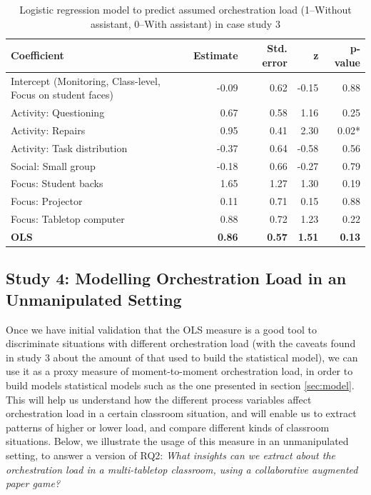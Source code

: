 \documentclass[10pt,journal,compsoc]{IEEEtran}
\begin{document}
\begin{table}[!t]
\caption{Logistic regression model to predict assumed orchestration load (1--Without assistant, 0--With assistant) in case study 3}
\label{tab:case3results}
\centering
\begin{tabular}{|p{2.8cm}||r|r|r|r|}
\hline
Coefficient & Estimate & Std. error & z & p-value\\
\hline
\hline
Intercept (Monitoring, Class-level, Focus on student faces) & -0.09 & 0.62 & -0.15 & 0.88 \\
Activity: Questioning & 0.67 & 0.58 & 1.16 & 0.25 \\
Activity: Repairs & 0.95 & 0.41 & 2.30 & 0.02* \\
Activity: Task distribution & -0.37 & 0.64 & -0.58 & 0.56 \\
Social: Small group & -0.18 & 0.66 & -0.27 & 0.79 \\
Focus: Student backs & 1.65 & 1.27 & 1.30 & 0.19 \\
Focus: Projector & 0.11 & 0.71 & 0.15 & 0.88 \\
Focus: Tabletop computer & 0.88 & 0.72 & 1.23 & 0.22 \\
\textbf{OLS} & \textbf{0.86} & \textbf{0.57} & \textbf{1.51} & \textbf{0.13} \\
\hline
\end{tabular}
\end{table}


\subsection{Study 4: Modelling Orchestration Load in an Unmanipulated Setting}
\label{sec:study4}

Once we have initial validation that the OLS measure is a good tool to discriminate situations with different orchestration load (with the caveats found in study 3 about the amount of that used to build the statistical model), we can use it as a proxy measure of moment-to-moment orchestration load, in order to build models statistical models such as the one presented in section \ref{sec:model}. This will help us understand how the different process variables affect orchestration load in a certain classroom situation, and will enable us to extract patterns of higher or lower load, and compare different kinds of classroom situations. Below, we illustrate the usage of this measure in an unmanipulated setting, to answer a version of RQ2: \textit{What insights can we extract about the orchestration load in a multi-tabletop classroom, using a collaborative augmented paper game?}
\end{document}
